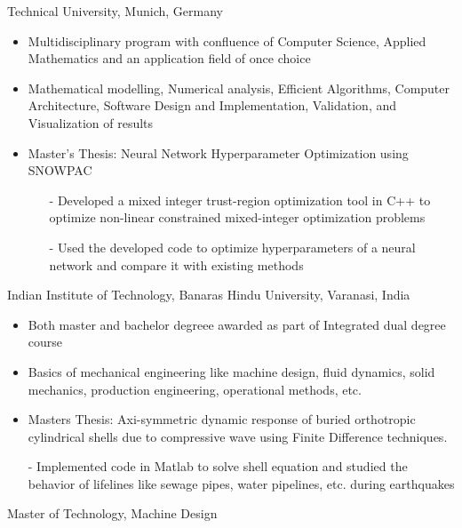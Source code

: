 \documentclass[helvetica,english,logo,notitle,totpages,utf8]{europecv2013}
\begin{document}

\begin{europecv}

\thispagestyle{plain}

\ecvpersonalinfo%



{Technical University, Munich, Germany}{
    \begin{itemize}
        \item Multidisciplinary program with confluence of Computer Science, Applied Mathematics and an application field of once choice
        \item Mathematical modelling, Numerical analysis, Efficient Algorithms, Computer Architecture, Software Design and Implementation, Validation, and Visualization of results
        \item Master's Thesis: Neural Network Hyperparameter Optimization using SNOWPAC
            \begin{itemize}
                \item[-] Developed a mixed integer trust-region optimization tool in C++ to optimize non-linear constrained mixed-integer optimization problems
                \item[-] Used the developed code to optimize hyperparameters of a neural network and compare it with existing methods
            \end{itemize}
    \end{itemize}
}{}

{Indian Institute of Technology, Banaras Hindu University, Varanasi, India}{
\begin{itemize}
    \item Both master and bachelor degreee awarded as part of Integrated dual degree course
    \item Basics of mechanical engineering like machine design, fluid dynamics, solid mechanics, production engineering, operational methods, etc.
    \item Masters Thesis: Axi-symmetric dynamic response of buried orthotropic cylindrical shells due to compressive wave using Finite Difference techniques. \par
            - Implemented code in Matlab to solve shell equation and studied the behavior of lifelines like sewage pipes, water pipelines, etc. during earthquakes
\end{itemize}
}
{Master of Technology, Machine Design}



\end{europecv}
\end{document}
